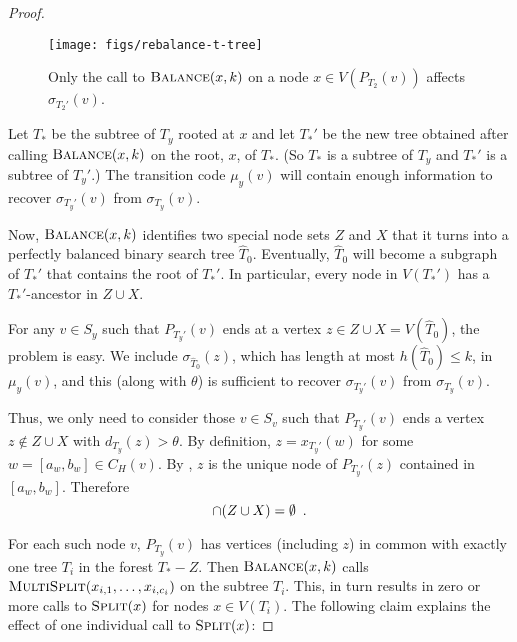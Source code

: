 \documentclass[kpfonts]{patmorin}
\let\le\leqslant
\begin{document}
\begin{proof}
  \begin{figure}
    \begin{center}
      \texttt{[image: figs/rebalance-t-tree]}
    \end{center}
    \caption{Only the call to $\textsc{Balance}(x,k)$ on a node $x\in V(P_{T_2}(v))$ affects $\sigma_{T_2'}(v)$.}
  \end{figure}

  Let $T_*$ be the subtree of $T_y$ rooted at $x$ and let $T_*'$ be the new tree obtained after calling $\textsc{Balance}(x,k)$ on the root, $x$, of $T_*$. (So $T_*$ is a subtree of $T_y$ and $T_*'$ is a subtree of $T_y'$.)
  The transition code $\mu_y(v)$ will contain enough information to recover $\sigma_{T_y'}(v)$ from $\sigma_{T_y}(v)$.

  Now, $\textsc{Balance}(x,k)$ identifies two special node sets $Z$ and $X$ that it turns into a perfectly balanced binary search tree $\hat{T}_0$.  Eventually, $\hat{T}_0$ will become a subgraph of $T_*'$ that contains the root of $T_*'$.   In particular, every node in $V(T_*')$ has a $T_*'$-ancestor in $Z\cup X$.

  For any $v\in S_y$ such that $P_{T_y'}(v)$ ends at a vertex $z\in Z\cup X=V(\hat{T}_0)$, the problem is easy.  We include $\sigma_{\hat{T}_0}(z)$, which has length at most $h(\hat{T}_0)\le k$, in $\mu_y(v)$, and this (along with $\theta$) is sufficient to recover $\sigma_{T_y'}(v)$ from $\sigma_{T_y}(v)$.

  Thus, we only need to consider those $v\in S_v$ such that $P_{T_y'}(v)$ ends a vertex $z\not\in Z\cup X$ with $d_{T_y}(z)>\theta$.    By definition,  $z=x_{T_y'}(w)$ for some $w=[a_w,b_w]\in C_H(v)$.  By , $z$ is the unique node of $P_{T_y'}(z)$ contained in $[a_w,b_w]$.  Therefore
  \begin{equation}
    [a_w,b_w]\cap (Z\cup X)=\emptyset \enspace . \eqlabel{empty}
  \end{equation}

  For each such node $v$, $P_{T_y}(v)$ has vertices (including $z$) in common with exactly one tree $T_{i}$ in the forest $T_*-Z$.  Then $\textsc{Balance}(x,k)$ calls $\textsc{MultiSplit}(x_{i,1},\ldots,x_{i,c_i})$ on the subtree $T_{i}$.  This, in turn results in zero or more calls to $\textsc{Split}(x)$ for nodes $x\in V(T_{i})$. The following claim explains the effect of one individual call to $\textsc{Split}(x)$:


\end{proof}
\end{document}
